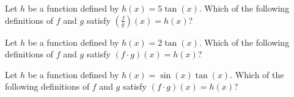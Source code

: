 \documentclass{ximera}
\author{Kenneth Berglund}
\begin{document}
\begin{exercise}
\item Let $h$ be a function defined by $h(x) = 5\tan(x)$. Which of the following definitions of $f$ and $g$ satisfy $\left(\frac{f}{g}\right)(x) = h(x)$?
\begin{multipleChoice}
\end{multipleChoice}

\item Let $h$ be a function defined by $h(x) = 2\tan(x)$. Which of the following definitions of $f$ and $g$ satisfy $(f \cdot g)(x) = h(x)$?
\begin{multipleChoice}
\end{multipleChoice}

\item Let $h$ be a function defined by $h(x) = \sin(x)\tan(x)$. Which of the following definitions of $f$ and $g$ satisfy $(f \cdot g)(x) = h(x)$?
\begin{multipleChoice}
\end{multipleChoice}

\end{exercise}
\end{document}
